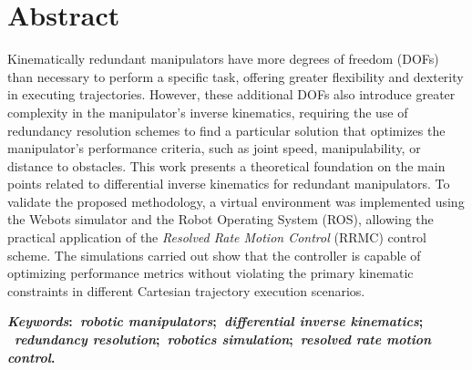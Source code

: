 \chapter*{Abstract}
\noindent Kinematically redundant manipulators have more degrees of freedom (DOFs) 
than necessary to perform a specific task, offering greater flexibility and dexterity 
in executing trajectories. However, these additional DOFs also introduce greater complexity 
in the manipulator's inverse kinematics, requiring the use of redundancy resolution schemes 
to find a particular solution that optimizes the manipulator's performance criteria, such as 
joint speed, manipulability, or distance to obstacles. This work presents a theoretical foundation
 on the main points related to differential inverse kinematics for redundant manipulators. To 
 validate the proposed methodology, a virtual environment was implemented using the Webots simulator 
 and the Robot Operating System (ROS), allowing the practical application of the \emph{Resolved Rate Motion Control} 
 (RRMC) control scheme. The simulations carried out show that the controller is capable of optimizing 
 performance metrics without violating the primary kinematic constraints in different Cartesian trajectory 
 execution scenarios.

  \vspace{5mm}

\noindent\textbf{
    \textit{Keywords}:~\textit{robotic manipulators};~\textit{differential inverse kinematics};
    ~\textit{redundancy resolution};~\textit{robotics simulation};~\textit{resolved rate motion control}.
}
